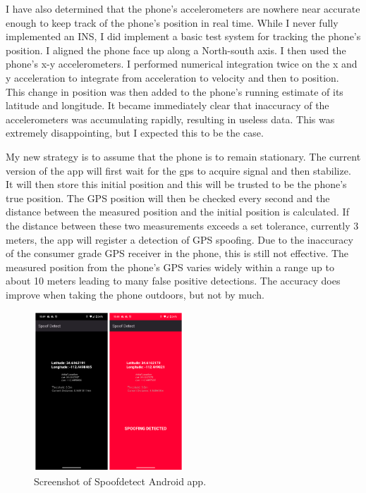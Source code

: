 \documentclass[conference]{IEEEtran}
\begin{document}
I have also determined that the phone’s accelerometers are nowhere near accurate enough to keep track of the phone’s position in real time. While I never fully implemented an INS, I did implement a basic test system for tracking the phone’s position. I aligned the phone face up along a North-south axis. I then used the phone’s x-y accelerometers. I performed numerical integration twice on the x and y acceleration to integrate from acceleration to velocity and then to position. This change in position was then added to the phone's running estimate of its latitude and longitude. It became immediately clear that inaccuracy of the accelerometers was accumulating rapidly, resulting in useless data. This was extremely disappointing, but I expected this to be the case.

My new strategy is to assume that the phone is to remain stationary. The current version of the app will first wait for the gps to acquire signal and then stabilize. It will then store this initial position and this will be trusted to be the phone's true position. The GPS position will then be checked every second and the distance between the measured position and the initial position is calculated. If the distance between these two measurements exceeds a set tolerance, currently 3 meters, the app will register a detection of GPS spoofing. Due to the inaccuracy of the consumer grade GPS receiver in the phone, this is still not effective. The measured position from the phone’s GPS varies widely within a range up to about 10 meters leading to many false positive detections. The accuracy does improve when taking the phone outdoors, but not by much.

\begin{figure}[htbp]
 \centerline{\includegraphics[width=0.5\textwidth]{figs/spoofdetect_app.png}}
 \caption{Screenshot of Spoofdetect Android app.}
\end{figure}
\end{document}

